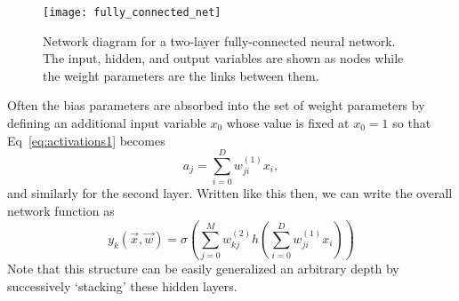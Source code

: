 \documentclass[../main.tex]{subfiles}
\begin{document}
%
\begin{figure}[htbp]
  \centering
  \texttt{[image: fully\_connected\_net]}
  \caption{Network diagram for a two-layer fully-connected neural network. The input, hidden, and output variables are
  shown as nodes while the weight parameters are the links between them.}%
\label{fig:fully_connected_net}
\end{figure}
%
Often the bias parameters are absorbed into the set of weight parameters by defining an additional input variable
$x_{0}$ whose value is fixed at $x_{0} = 1$ so that Eq~\ref{eq:activations1} becomes
%
\begin{equation}
  a_{j} = \sum_{i=0}^{D} w_{ji}^{(1)} x_{i},
\end{equation}
%
and similarly for the second layer.
%
Written like this then, we can write the overall network function as
%
\begin{equation}
  y_{k}{(\vec{x}, \vec{w})} = \sigma{\left(\sum_{j=0}^{M}w_{kj}^{(2)}
    h{\left(\sum_{i=0}^{D}w_{ji}^{(1)}x_{i}\right)}\right)}
\end{equation}
%
Note that this structure can be easily generalized an arbitrary depth by successively `stacking' these hidden layers.
%
\end{document}
